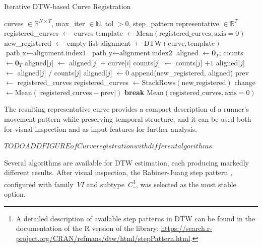 \begin{algorithm}
\caption{Iterative DTW-based Curve Registration}
\begin{algorithmic}[1]
\Require curves $\in \mathbb{R}^{N \times T}$, max\_iter $\in \mathbb{N}$, tol $> 0$, step\_pattern
\Ensure representative $\in \mathbb{R}^T$
\State registered\_curves $\gets$ curves
    \State template $\gets \mathrm{Mean}(\text{registered\_curves}, \text{axis}=0)$ 
    \State new\_registered $\gets$ empty list
        \State alignment $\gets \mathrm{DTW}(\text{curve}, \text{template})$
        \State $\text{path\_x} \gets \text{alignment.index1}$ 
        \State $\text{path\_y} \gets \text{alignment.index2}$ 
        \State aligned $\gets \mathbf{0}_T$; counts $\gets \mathbf{0}_T$
            \State aligned[$j$] $\gets$ aligned[$j$] $+$ curve[$i$] 
            \State counts[$j$] $\gets$ counts[$j$] $+ 1$
        \EndFor
                \State aligned[$j$] $\gets$ aligned[$j$] / counts[$j$] 
            \Else
                \State aligned[$j$] $\gets 0$
            \EndIf
        \EndFor
        \State append(new\_registered, aligned)
    \EndFor
    \State prev $\gets$ registered\_curves
    \State registered\_curves $\gets \mathrm{StackRows}(\text{new\_registered})$ 
        \State change $\gets \mathrm{Mean}(|\text{registered\_curves} - \text{prev}|)$
            \State \textbf{break}
        \EndIf
    \EndIf
\EndFor
\State \Return $\mathrm{Mean}(\text{registered\_curves}, \text{axis}=0)$
\end{algorithmic}
\end{algorithm}

The resulting representative curve provides a compact description of a runner's movement pattern while preserving temporal structure, and it can be used both for visual inspection and as input features for further analysis.

$TODO ADD FIGURE of Curve registration with different algorithms.$

Several algorithms are available for DTW estimation, each producing markedly different results. After visual inspection, the Rabiner-Juang step pattern \citep{Rabiner1993}, configured with family~$VI$ and subtype~$C$\footnote{A detailed description of available step patterns in DTW can be found in the documentation of the R version of the library: \url{https://search.r-project.org/CRAN/refmans/dtw/html/stepPattern.html}.}, was selected as the most stable option.

